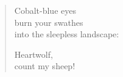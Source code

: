 

\begin{verse}
Cobalt-blue eyes\\
burn your swathes\\
into the sleepless landscape:

Heartwolf,\\
count my sheep!
\end{verse}

